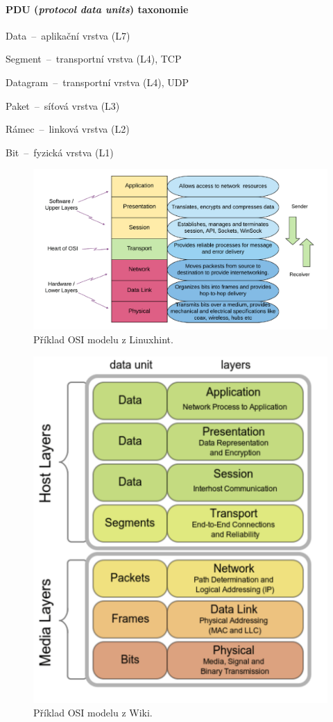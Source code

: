 \paragraph*{PDU (\textit{protocol data units}) taxonomie} \begin{compactitem}
    \item Data~--~aplikační vrstva (L7)
    \item Segment~--~transportní vrstva (L4), TCP
    \item Datagram~--~transportní vrstva (L4), UDP
    \item Paket~--~síťová vrstva (L3)
    \item Rámec~--~linková vrstva (L2)
    \item Bit~--~fyzická vrstva (L1)
\end{compactitem}

\begin{figure}[H]
    \centering
    \includegraphics[width=1\linewidth]{osi_model_linuxhint.pdf}
    \caption{Příklad OSI modelu z Linuxhint.}
\end{figure}

\begin{figure}[H]
    \centering
    \includegraphics[width=0.65\linewidth]{osi_model_wiki.pdf}
    \caption{Příklad OSI modelu z Wiki.}
\end{figure}

